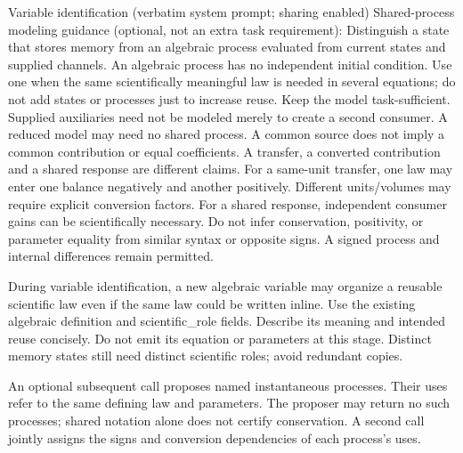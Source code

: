 \begin{afpromptbox}{Variable identification (verbatim system prompt; sharing enabled)}
Shared-process modeling guidance (optional, not an extra task requirement):
Distinguish a state that stores memory from an algebraic process evaluated
from current states and supplied channels. An algebraic process has no
independent initial condition. Use one when the same scientifically
meaningful law is needed in several equations; do not add states or
processes just to increase reuse. Keep the model task-sufficient. Supplied
auxiliaries need not be modeled merely to create a second consumer. A
reduced model may need no shared process. A common source does not imply a
common contribution or equal coefficients. A transfer, a converted
contribution and a shared response are different claims. For a same-unit
transfer, one law may enter one balance negatively and another positively.
Different units/volumes may require explicit conversion factors. For a
shared response, independent consumer gains can be scientifically necessary.
Do not infer conservation, positivity, or parameter equality from similar
syntax or opposite signs. A signed process and internal differences remain
permitted.

During variable identification, a new algebraic variable may organize a
reusable scientific law even if the same law could be written inline. Use
the existing algebraic definition and scientific_role fields. Describe its
meaning and intended reuse concisely. Do not emit its equation or parameters
at this stage. Distinct memory states still need distinct scientific roles;
avoid redundant copies.
\end{afpromptbox}

An optional subsequent call proposes named instantaneous processes. Their uses
refer to the same defining law and parameters. The proposer may return no such
processes; shared notation alone does not certify conservation. A second call
jointly assigns the signs and conversion dependencies of each process's uses.

